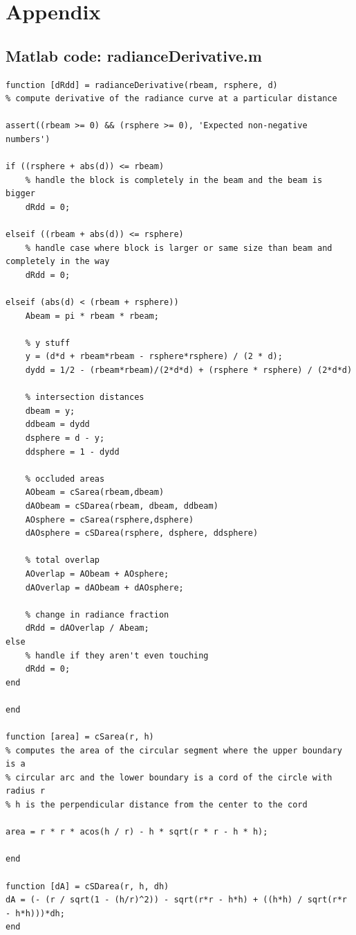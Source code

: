 \documentclass{article}
\theoremstyle{plain}
\theoremstyle{definition}
\theoremstyle{remark}
\begin{document}
\newpage
\section*{Appendix}
\subsection*{Matlab code: radianceDerivative.m}
\begin{verbatim}
function [dRdd] = radianceDerivative(rbeam, rsphere, d)
% compute derivative of the radiance curve at a particular distance

assert((rbeam >= 0) && (rsphere >= 0), 'Expected non-negative numbers')

if ((rsphere + abs(d)) <= rbeam)
    % handle the block is completely in the beam and the beam is bigger
    dRdd = 0;
    
elseif ((rbeam + abs(d)) <= rsphere)
    % handle case where block is larger or same size than beam and completely in the way
    dRdd = 0;
    
elseif (abs(d) < (rbeam + rsphere))
    Abeam = pi * rbeam * rbeam;
    
    % y stuff
    y = (d*d + rbeam*rbeam - rsphere*rsphere) / (2 * d);
    dydd = 1/2 - (rbeam*rbeam)/(2*d*d) + (rsphere * rsphere) / (2*d*d)
    
    % intersection distances
    dbeam = y;
    ddbeam = dydd
    dsphere = d - y;
    ddsphere = 1 - dydd
    
    % occluded areas
    AObeam = cSarea(rbeam,dbeam)
    dAObeam = cSDarea(rbeam, dbeam, ddbeam)
    AOsphere = cSarea(rsphere,dsphere)
    dAOsphere = cSDarea(rsphere, dsphere, ddsphere)
    
    % total overlap
    AOverlap = AObeam + AOsphere;
    dAOverlap = dAObeam + dAOsphere;
    
    % change in radiance fraction
    dRdd = dAOverlap / Abeam;
else
    % handle if they aren't even touching
    dRdd = 0;
end

end

function [area] = cSarea(r, h) 
% computes the area of the circular segment where the upper boundary is a
% circular arc and the lower boundary is a cord of the circle with radius r
% h is the perpendicular distance from the center to the cord

area = r * r * acos(h / r) - h * sqrt(r * r - h * h);

end

function [dA] = cSDarea(r, h, dh)
dA = (- (r / sqrt(1 - (h/r)^2)) - sqrt(r*r - h*h) + ((h*h) / sqrt(r*r - h*h)))*dh;
end
\end{verbatim}
\end{document}
